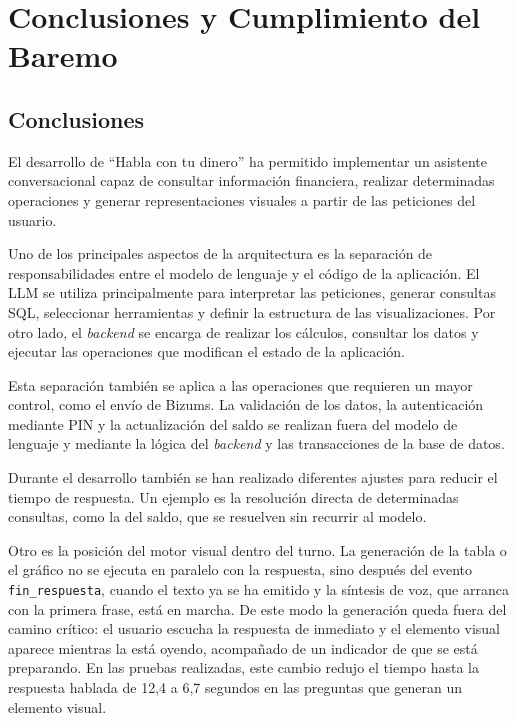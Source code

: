 \section{Conclusiones y Cumplimiento del Baremo}

\subsection{Conclusiones}

El desarrollo de ``Habla con tu dinero'' ha permitido implementar un asistente
conversacional capaz de consultar información financiera, realizar determinadas
operaciones y generar representaciones visuales a partir de las peticiones del
usuario.

Uno de los principales aspectos de la arquitectura es la separación de
responsabilidades entre el modelo de lenguaje y el código de la aplicación. El
LLM se utiliza principalmente para interpretar las peticiones, generar
consultas SQL, seleccionar herramientas y definir la estructura de las
visualizaciones. Por otro lado, el \emph{backend} se encarga de realizar los cálculos,
consultar los datos y ejecutar las operaciones que modifican el estado de la
aplicación.

Esta separación también se aplica a las operaciones que requieren un mayor
control, como el envío de Bizums. La validación de los datos, la autenticación
mediante PIN y la actualización del saldo se realizan fuera del modelo de
lenguaje y mediante la lógica del \emph{backend} y las transacciones de la base de
datos.

Durante el desarrollo también se han realizado diferentes ajustes para reducir
el tiempo de respuesta. Un ejemplo es la resolución directa de determinadas
consultas, como la del saldo, que se resuelven sin recurrir al modelo.

Otro es la posición del motor visual dentro del turno. La generación de la
tabla o el gráfico no se ejecuta en paralelo con la respuesta, sino después del 
evento \texttt{fin\_respuesta}, cuando el texto
ya se ha emitido y la síntesis de voz, que arranca con la primera frase, está en
marcha. De este modo la generación queda fuera del camino crítico: el usuario escucha la respuesta de inmediato y el elemento visual
aparece mientras la está oyendo, acompañado de un indicador de que se está
preparando. En las pruebas realizadas, este cambio redujo el tiempo hasta la
respuesta hablada de 12,4 a 6,7 segundos en las preguntas que generan un
elemento visual.

